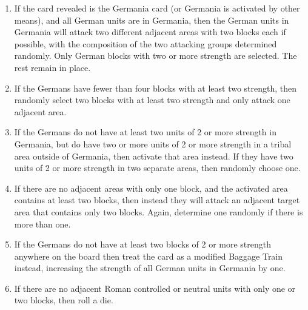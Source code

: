 \begin{enumerate}
\begin{enumerate}[leftmargin=0in]
    \textbf{Exception:} A lone Barbarian unit at strength 1 will not enter an enemy-occupied area. It may join another attacking force; otherwise, it remains in place.

    If there is more than one area that contains one block, then select one randomly. Roman controlled areas should be prioritized over neutral areas.

    If there are no adjacent areas with only one block then skip to \ref{solitaire:attack_two}

    If there aren't any Roman controlled or neutral areas adjacent, then activate the Germans instead as per \ref{solitaire:germania}.

    \item \label{solitaire:germania}If the card revealed is the Germania card (or Germania is activated by other means), and all German units are in Germania, then the German units in Germania will attack two different adjacent areas with two blocks each if possible, with the composition of the two attacking groups determined randomly. Only German blocks with two or more strength are selected. The rest remain in place.

    \item If the Germans have fewer than four blocks with at least two strength, then randomly select two blocks with at least two strength and only attack one adjacent area.

    \item If the Germans do not have at least two units of 2 or more strength in Germania, but do have two or more units of 2 or more strength in a tribal area outside of Germania, then activate that area instead. If they have two units of 2 or more strength in two separate areas, then randomly choose one.

    \item \label{solitaire:attack_two}If there are no adjacent areas with only one block, and the activated area contains at least two blocks, then instead they will attack an adjacent target area that contains only two blocks. Again, determine one randomly if there is more than one.

    \item If the Germans do not have at least two blocks of 2 or more strength anywhere on the board then treat the card as a modified Baggage Train instead, increasing the strength of all German units in Germania by one.

    \item If there are no adjacent Roman controlled or neutral units with only one or two blocks, then roll a die.


\end{enumerate}
\end{enumerate}
